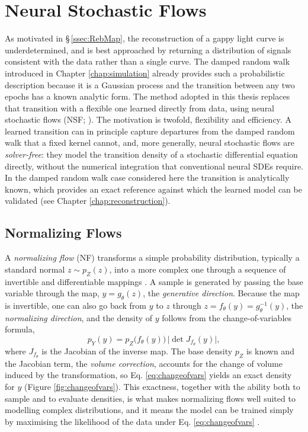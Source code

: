 \chapter{Neural Stochastic Flows}
\label{chap:nsf}

As motivated in \S\,\ref{ssec:RebMap}, the reconstruction of a gappy light curve is underdetermined, and is best approached by returning a distribution of signals consistent with the data rather than a single curve. The damped random walk introduced in Chapter \ref{chap:simulation} already provides such a probabilistic description because it is a Gaussian process and the transition between any two epochs has a known analytic form. The method adopted in this thesis replaces that transition with a flexible one learned directly from data, using neural stochastic flows (NSF; \cite{Kiyohara2025SNF}). The motivation is twofold, flexibility and efficiency. A learned transition can in principle capture departures from the damped random walk that a fixed kernel cannot, and, more generally, neural stochastic flows are \textit{solver-free}: they model the transition density of a stochastic differential equation directly, without the numerical integration that conventional neural SDEs require. In the damped random walk case considered here the transition is analytically known, which provides an exact reference against which the learned model can be validated (see Chapter \ref{chap:reconstruction}). 

\section{Normalizing Flows}
\label{sec:normflows}

A \textit{normalizing flow} (NF) transforms a simple probability distribution, typically a standard normal $z \sim p_Z(z)$, into a more complex one through a sequence of invertible and differentiable mappings \parencites{Rezende2016VIwNF}{Kobyzev2021NFRev}. A sample is generated by passing the base variable through the map, $y = g_\theta(z)$, the \textit{generative direction}. Because the map is invertible, one can also go back from $y$ to $z$ through $z = f_\theta(y) = g_\theta^{-1}(y)$, the \textit{normalizing direction}, and the density of $y$ follows from the change-of-variables formula,
\begin{equation}
    \label{eq:changeofvars}
    p_Y(y) = p_Z\big(f_\theta(y)\big)\,\big|\det J_{f_\theta}(y)\big|,
\end{equation}
where $J_{f_\theta}$ is the Jacobian of the inverse map. The base density $p_Z$ is known and the Jacobian term, the \textit{volume correction}, accounts for the change of volume induced by the transformation, so Eq. \ref{eq:changeofvars} yields an exact density for $y$ (Figure \ref{fig:changeofvars}). This exactness, together with the ability both to sample and to evaluate densities, is what makes normalizing flows well suited to modelling complex distributions, and it means the model can be trained simply by maximising the likelihood of the data under Eq. \ref{eq:changeofvars} \parencite{Kobyzev2021NFRev}.

